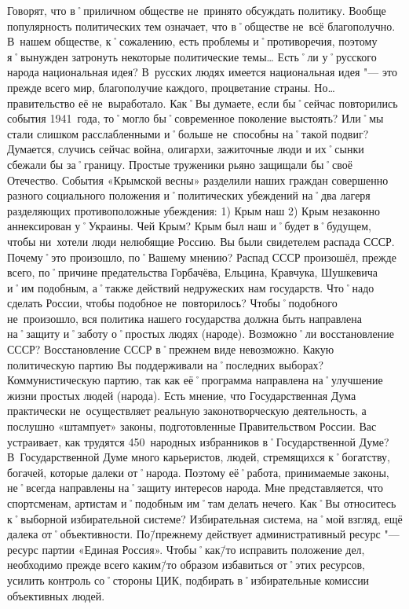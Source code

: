 \begin{drama}
\pagebreak
	
	\maxspeaks Говорят, что в˚приличном обществе не~принято обсуждать политику. Вообще популярность политических тем означает, что в˚обществе не~всё благополучно. В~нашем обществе, к˚сожалению, есть проблемы и˚противоречия, поэтому я˚вынужден затронуть некоторые политические темы… Есть˚ли у˚русского народа национальная идея?
	\michaelspeaks В~русских людях имеется национальная идея "--- это прежде всего мир, благополучие каждого, процветание страны. Но… правительство её не~выработало.
	\maxspeaks Как˚Вы думаете, если бы˚сейчас повторились события 1941~года, то˚могло бы˚современное поколение выстоять? Или˚мы стали слишком расслабленными и˚больше не~способны на˚такой подвиг?
	\michaelspeaks Думается, случись сейчас война, олигархи, зажиточные люди и их˚сынки сбежали бы за˚границу. Простые труженики рьяно защищали бы˚своё Отечество.
	\maxspeaks События «Крымской весны» разделили наших граждан совершенно разного социального положения и˚политических убеждений на˚два лагеря разделяющих противоположные убеждения: 1) Крым наш 2) Крым незаконно аннексирован у˚Украины. Чей Крым?
	\michaelspeaks Крым был наш и˚будет в˚будущем, чтобы ни~хотели люди нелюбящие Россию.
	\maxspeaks Вы были свидетелем распада СССР. Почему˚это произошло, по˚Вашему мнению? 
	\michaelspeaks Распад СССР произошёл, прежде всего, по˚причине предательства Горбачёва, Ельцина, Кравчука, Шушкевича и˚им подобным, а˚также действий недружеских нам государств.	
	\maxspeaks Что˚надо сделать России, чтобы подобное не~повторилось? 
	\michaelspeaks Чтобы˚подобного не~произошло, вся политика нашего государства должна быть направлена на˚защиту и˚заботу о˚простых людях (народе).
	\maxspeaks Возможно˚ли восстановление СССР?
	\michaelspeaks Восстановление СССР в˚прежнем виде невозможно. 
	\maxspeaks Какую политическую партию Вы поддерживали на˚последних выборах? 
	\michaelspeaks Коммунистическую партию, так как её˚программа направлена на˚улучшение жизни простых людей (народа).
	\maxspeaks Есть мнение, что Государственная Дума практически не~осуществляет реальную законотворческую деятельность, а послушно «штампует» законы, подготовленные Правительством России. Вас устраивает, как трудятся 450~народных избранников в˚Государственной Думе? 
	\michaelspeaks В~Государственной Думе много карьеристов, людей, стремящихся к˚богатству, богачей, которые далеки от˚народа. Поэтому её˚работа, принимаемые законы, не˚всегда направлены на˚защиту интересов народа. Мне представляется, что спортсменам, артистам и˚подобным им˚там делать нечего.
	\maxspeaks Как˚Вы относитесь к˚выборной избирательной системе? 
	\michaelspeaks Избирательная система, на˚мой взгляд, ещё далека от˚объективности. По\=/прежнему действует административный ресурс "--- ресурс партии «Единая Россия». Чтобы˚как\=/то исправить положение дел, необходимо прежде всего каким\=/то образом избавиться от˚этих ресурсов, усилить контроль со˚стороны ЦИК, подбирать в˚избирательные комиссии объективных людей.	
	

\end{drama}
